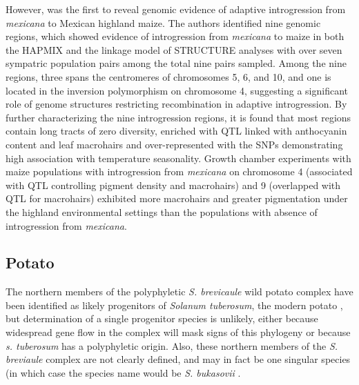 \documentclass[11pt]{article}
\begin{document}
However, \cite{hufford2013} was the first to reveal genomic evidence of adaptive introgression from \emph{mexicana} to Mexican highland maize.
The authors identified nine genomic regions, which showed evidence of introgression from \emph{mexicana} to maize in both the HAPMIX and the linkage model of STRUCTURE analyses with over seven sympatric population pairs among the total nine pairs sampled. 
Among the nine regions, three spans the centromeres of chromosomes 5, 6, and 10, and one is located in the inversion polymorphism on chromosome 4, suggesting a significant role of genome structures restricting recombination in adaptive introgression.
By further characterizing the nine introgression regions, it is found that most regions contain long tracts of zero diversity, enriched with QTL linked with anthocyanin content and leaf macrohairs \cite{lauter2004} and over-represented with the SNPs demonstrating high association with temperature seasonality.
Growth chamber experiments with maize populations with introgression from \emph{mexicana} on chromosome 4 (associated with QTL controlling pigment density and macrohairs) and 9 (overlapped with QTL for macrohairs) exhibited more macrohairs and greater pigmentation under the highland environmental settings than the populations with absence of introgression from \emph{mexicana}.





\subsection*{Potato}

The northern members of the polyphyletic \emph{S. brevicaule} wild potato complex have been identified as likely progenitors of \emph{Solanum tuberosum}, the modern potato \cite{correll1962potato}, but determination of a single progenitor species is unlikely, either because widespread gene flow in the complex will mask signs of this phylogeny or because \emph{s. tuberosum} has a polyphyletic origin.
Also, these northern members of the \emph{S. breviaule} complex are not clearly defined, and may in fact be one singular species (in which case the species name would be \emph{S. bukasovii} \cite{spooner2005single}.
\end{document}
